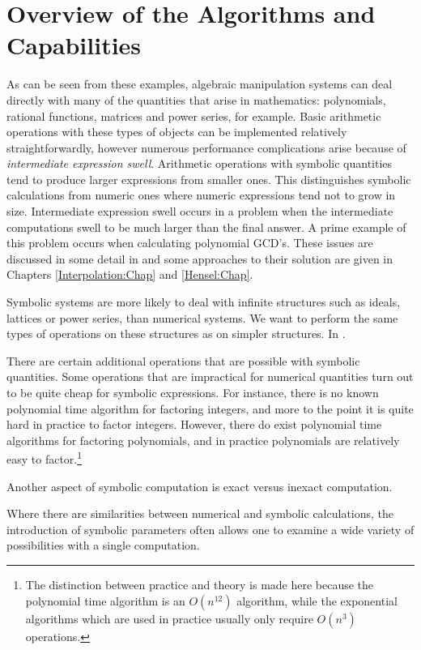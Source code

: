 \section{Overview of the Algorithms and Capabilities}

As can be seen from these examples, algebraic manipulation systems can deal
directly with many of the quantities that arise in mathematics:
polynomials, rational functions, matrices and power series, for example.
Basic arithmetic operations with these types of objects can be implemented
relatively straightforwardly, however numerous performance complications
arise because of {\em intermediate expression swell\/}.  Arithmetic
operations with symbolic quantities tend to produce larger expressions from
smaller ones.  This distinguishes symbolic calculations from numeric ones
where numeric expressions tend not to grow in size.  Intermediate
expression swell occurs in a problem when the intermediate computations
swell to be much larger than the final answer.  A prime example of this
problem occurs when calculating polynomial GCD's.  These issues are
discussed in some detail in  and some approaches
to their solution are given in Chapters \ref{Interpolation:Chap} and
\ref{Hensel:Chap}. 

Symbolic systems are more likely to deal with infinite structures such as
ideals, lattices or power series, than numerical systems.  We want to perform
the same types of operations on these structures as on simpler structures.
In .

There are certain additional operations that are possible with symbolic
quantities.   
Some operations that are impractical for numerical quantities
turn out to be quite cheap for symbolic expressions.  For instance,
there is no known polynomial time algorithm for factoring integers, and
more to the point it is quite hard in practice to factor integers.
However, there do exist polynomial time algorithms for factoring
polynomials, and in practice polynomials are relatively easy to
factor.\footnote{The distinction between practice and theory is made here
because the polynomial time algorithm is an $O(n^{12})$ algorithm, while
the exponential algorithms which are used in practice  usually only 
require $O(n^{3})$ operations.}

Another	aspect of symbolic computation is exact versus inexact computation.

Where there are similarities between numerical and symbolic calculations,
the introduction of symbolic parameters often allows one to examine a wide
variety of possibilities with a single computation.

